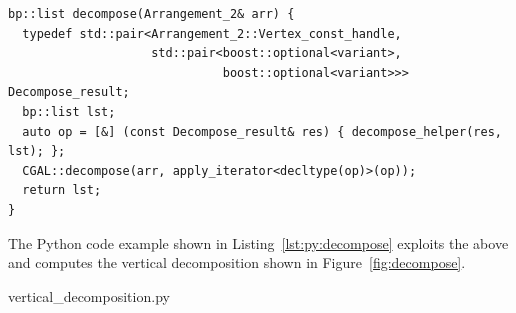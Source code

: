 \begin{lstfloat}
  \begin{lstlisting}[style=cppFramedStyle,basicstyle=\normalsize,%
                     label={lst:decomposeWrapper},%
                     caption={A function that wraps the function shown in Listing~\ref{lst:decompose} and returns a Python list that represents a vertical decomposition.}]
bp::list decompose(Arrangement_2& arr) {
  typedef std::pair<Arrangement_2::Vertex_const_handle,
                    std::pair<boost::optional<variant>,
                              boost::optional<variant>>>        Decompose_result;
  bp::list lst;
  auto op = [&] (const Decompose_result& res) { decompose_helper(res, lst); };
  CGAL::decompose(arr, apply_iterator<decltype(op)>(op));
  return lst;
}
  \end{lstlisting}
\end{lstfloat}

The Python code example shown in Listing~\ref{lst:py:decompose}
exploits the above and computes the vertical decomposition shown in
Figure~\ref{fig:decompose}.


\begin{lstfloat}
  \def\filename{vertical_decomposition.py}%
  
                  {\pythonDir\filename}
\end{lstfloat}

